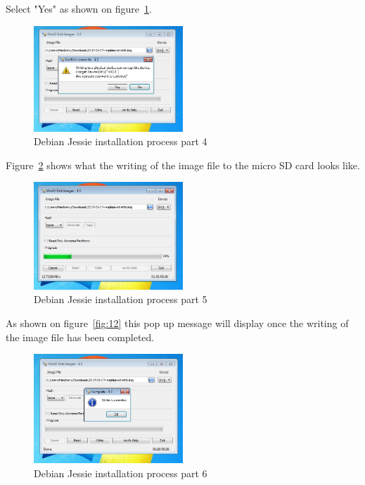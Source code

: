 \documentclass[12pt,]{article}
\begin{document}
Select "Yes" as shown on figure~\ref{fig:10}.
\begin{figure}[H]
  	\begin{center}
    	\includegraphics[width=0.5\textwidth]{Win32_10}
  	\end{center}
  	\caption{Debian Jessie installation process part 4}
	\label{fig:10}
\end{figure}
Figure~\ref{fig:11} shows what the writing of the image file to the micro SD card looks like.
\begin{figure}[H]
  	\begin{center}
    	\includegraphics[width=0.5\textwidth]{Win32_11}
  	\end{center}
  	\caption{Debian Jessie installation process part 5}
	\label{fig:11}
\end{figure}
As shown on figure~\ref{fig:12} this pop up message will display once the writing of the image file has been completed.
\begin{figure}[H]
  	\begin{center}
    	\includegraphics[width=0.5\textwidth]{Win32_12}
  	\end{center}
  	\caption{Debian Jessie installation process part 6}
	\label{fig:16}
\end{figure}
\end{document}
